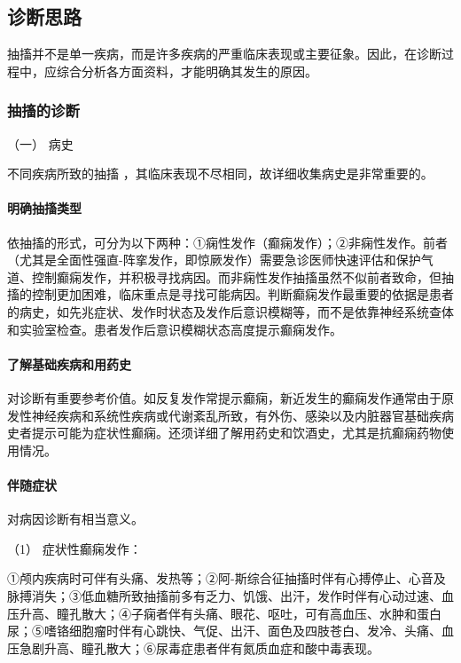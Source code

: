 \subsection{诊断思路}

抽搐并不是单一疾病，而是许多疾病的严重临床表现或主要征象。因此，在诊断过程中，应综合分析各方面资料，才能明确其发生的原因。

\subsubsection{抽搐的诊断}

\hypertarget{text00016.htmlux5cux23CHP1-5-2-1-1}{}
（一） 病史

不同疾病所致的抽搐 ，其临床表现不尽相同，故详细收集病史是非常重要的。

\paragraph{明确抽搐类型}

依抽搐的形式，可分为以下两种：①痫性发作（癫痫发作）；②非痫性发作。前者（尤其是全面性强直-阵挛发作，即惊厥发作）需要急诊医师快速评估和保护气道、控制癫痫发作，并积极寻找病因。而非痫性发作抽搐虽然不似前者致命，但抽搐的控制更加困难，临床重点是寻找可能病因。判断癫痫发作最重要的依据是患者的病史，如先兆症状、发作时状态及发作后意识模糊等，而不是依靠神经系统查体和实验室检查。患者发作后意识模糊状态高度提示癫痫发作。

\paragraph{了解基础疾病和用药史}

对诊断有重要参考价值。如反复发作常提示癫痫，新近发生的癫痫发作通常由于原发性神经疾病和系统性疾病或代谢紊乱所致，有外伤、感染以及内脏器官基础疾病史者提示可能为症状性癫痫。还须详细了解用药史和饮酒史，尤其是抗癫痫药物使用情况。

\paragraph{伴随症状}

对病因诊断有相当意义。

\hypertarget{text00016.htmlux5cux23CHP1-5-2-1-1-3-1}{}
（1） 症状性癫痫发作：

①颅内疾病时可伴有头痛、发热等；②阿-斯综合征抽搐时伴有心搏停止、心音及脉搏消失；③低血糖所致抽搐前多有乏力、饥饿、出汗，发作时伴有心动过速、血压升高、瞳孔散大；④子痫者伴有头痛、眼花、呕吐，可有高血压、水肿和蛋白尿；⑤嗜铬细胞瘤时伴有心跳快、气促、出汗、面色及四肢苍白、发冷、头痛、血压急剧升高、瞳孔散大；⑥尿毒症患者伴有氮质血症和酸中毒表现。

